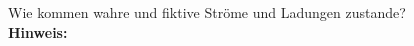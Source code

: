 \begin{question}[section=,subsection=,name={Wahre und fiktive Ladungen und Ströme},difficulty=,type=mdl,mode=exm,tags={}]
	Wie kommen wahre und fiktive Ströme und Ladungen zustande?
	\\ \textbf{Hinweis:}\\
	
\end{question}
\begin{solution}
	
\end{solution}
